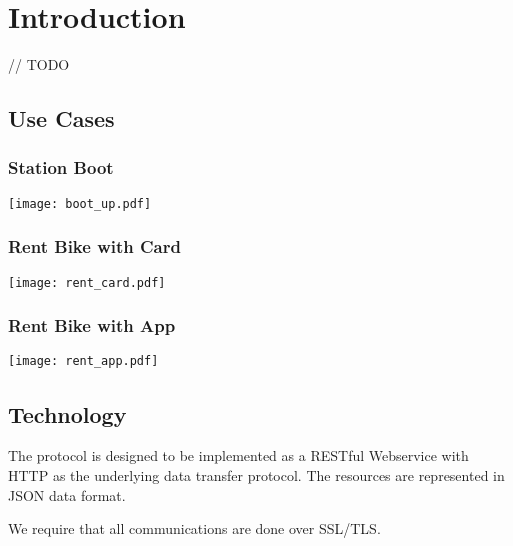 \section{Introduction}

// TODO


\subsection{Use Cases}

\subsubsection{Station Boot}

\texttt{[image: boot\_up.pdf]}

\subsubsection{Rent Bike with Card}

\texttt{[image: rent\_card.pdf]}

\subsubsection{Rent Bike with App}

\texttt{[image: rent\_app.pdf]}


\subsection{Technology}

The protocol is designed to be implemented as a RESTful Webservice with HTTP as the underlying data transfer protocol. The resources are represented in JSON data format.

We require that all communications are done over SSL/TLS.